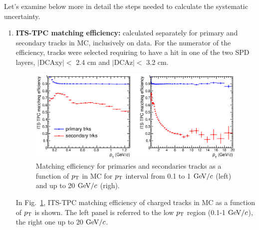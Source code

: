 Let's examine below more in detail the steps needed to 
calculate the systematic uncertainty.
\begin{enumerate}
\item {\bf ITS-TPC matching efficiency:} calculated separately for 
primary and secondary tracks in MC, inclusively on data. For 
the numerator of the efficiency, tracks were selected requiring 
to have a hit in one of the two SPD layers, 
$|$DCAxy$|<$ 2.4 cm and $|$DCAz$|<$ 3.2 cm.
\begin{figure}[!htb]
\centering
\includegraphics[width=1\textwidth]{FigCap4/ITSTPC_matchEff_vsPt_LowFullpt.eps}
\caption{Matching efficiency for primaries and secondaries tracks as a function of $p_{\rm T}$ in MC for $p_{\rm T}$ interval from 0.1 to 1 $\mathrm{GeV}/c$ (left) and up to 20 $\mathrm{GeV}/c$ (righ). }
\label{fig:matcheff_pt}
\end{figure}

In Fig.~\ref{fig:matcheff_pt}, ITS-TPC matching efficiency 
of charged tracks in MC as a function of 
$p_{\rm T}$ is shown. The left panel is referred to the low $p_{\rm T}$ region (0.1-1 $\mathrm{GeV}/c$), 
the right one up to 20 $\mathrm{GeV}/c$. 


\end{enumerate}
